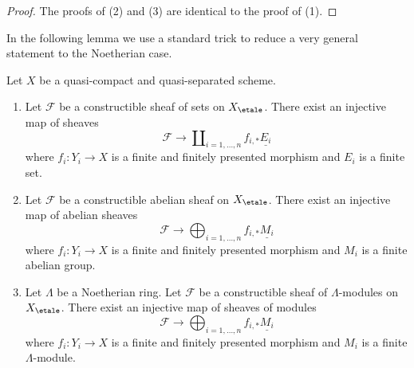 \begin{proof}
\medskip\noindent
The proofs of (2) and (3) are identical to the proof of (1).
\end{proof}

\noindent
In the following lemma we use a standard trick to reduce a very general
statement to the Noetherian case.

\begin{lemma}
\label{lemma-constructible-maps-into-constant-general}
Let $X$ be a quasi-compact and quasi-separated scheme.
\begin{enumerate}
\item Let $\mathcal{F}$ be a constructible sheaf of sets on $X_\etale$.
There exist an injective map of sheaves
$$
\mathcal{F} \longrightarrow
\coprod\nolimits_{i = 1, \ldots, n} f_{i, *}\underline{E_i}
$$
where $f_i : Y_i \to X$ is a finite and finitely presented morphism and
$E_i$ is a finite set.
\item Let $\mathcal{F}$ be a constructible abelian sheaf on $X_\etale$.
There exist an injective map of abelian sheaves
$$
\mathcal{F} \longrightarrow
\bigoplus\nolimits_{i = 1, \ldots, n} f_{i, *}\underline{M_i}
$$
where $f_i : Y_i \to X$ is a finite and finitely presented morphism and
$M_i$ is a finite abelian group.
\item Let $\Lambda$ be a Noetherian ring.
Let $\mathcal{F}$ be a constructible sheaf of $\Lambda$-modules on $X_\etale$.
There exist an injective map of sheaves of modules
$$
\mathcal{F} \longrightarrow
\bigoplus\nolimits_{i = 1, \ldots, n} f_{i, *}\underline{M_i}
$$
where $f_i : Y_i \to X$ is a finite and finitely presented morphism and
$M_i$ is a finite $\Lambda$-module.
\end{enumerate}
\end{lemma}

